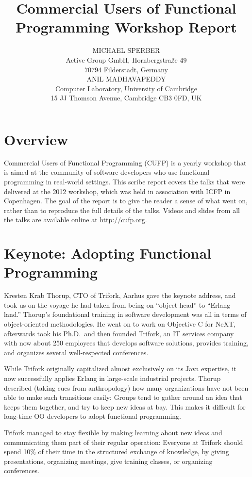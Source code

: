 \documentclass{jfp1}
\title[Commercial Users of Functional Programming 2012]
      {Commercial Users of Functional Programming Workshop Report}
\author[Michael Sperber and Anil Madhavapeddy]
       {MICHAEL SPERBER\\
         Active Group GmbH, Hornbergstra\ss{}e 49\\
         70794 Filderstadt, Germany\\
         ANIL MADHAVAPEDDY\\
        Computer Laboratory, University of Cambridge\\ 
        15 JJ Thomson Avenue, Cambridge CB3 0FD, UK}
\begin{document}
\label{firstpage}
\maketitle

\section{Overview}

Commercial Users of Functional Programming (CUFP) is a yearly workshop
that is aimed at the community of software developers who use functional
programming in real-world settings.  This scribe report covers the talks
that were delivered at the 2012 workshop, which was held in association
with ICFP in Copenhagen.  The goal of the report is to give the reader
a sense of what went on, rather than to reproduce the full details
of the talks.  Videos and slides from all the talks are available online at \url{http://cufp.org}.

\section{Keynote: Adopting Functional Programming}

Kresten Krab Thorup, CTO of Trifork, Aarhus gave the keynote address,
and took us on the voyage he had taken from being on ``object head''
to ``Erlang land.''  Thorup's foundational training in software
development was all in terms of object-oriented methodologies.  He
went on to work on Objective C for NeXT, afterwards took his Ph.D.\
and then founded Trifork, an IT services company with now about 250
employees that develops software solutions, provides training, and
organizes several well-respected conferences.

While Trifork originally capitalized almost exclusively on its Java
expertise, it now successfully applies Erlang in large-scale
industrial projects.  Thorup described (taking cues from anthropology)
how many organizations have not been able to make such transitions
easily: Groups tend to gather around an idea that keeps them together,
and try to keep new ideas at bay.  This makes it difficult for
long-time OO developers to adopt functional programming.

Trifork managed to stay flexible by making learning about new ideas
and communicating them part of their regular operation: Everyone at
Trifork should spend 10\% of their time in the structured exchange of
knowledge, by giving presentations, organizing meetings, give training
classes, or organizing conferences.
\end{document}
